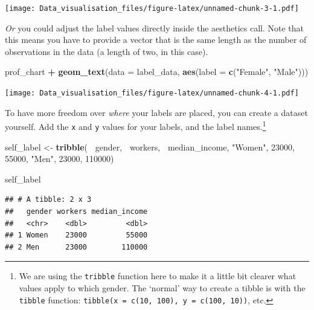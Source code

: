 \documentclass[]{book}
\newenvironment{Shaded}{\begin{snugshade}}{\end{snugshade}}
\newcommand{\DataTypeTok}[1]{\textcolor[rgb]{0.13,0.29,0.53}{#1}}
\newcommand{\DecValTok}[1]{\textcolor[rgb]{0.00,0.00,0.81}{#1}}
\newcommand{\KeywordTok}[1]{\textcolor[rgb]{0.13,0.29,0.53}{\textbf{#1}}}
\newcommand{\NormalTok}[1]{#1}
\newcommand{\OperatorTok}[1]{\textcolor[rgb]{0.81,0.36,0.00}{\textbf{#1}}}
\newcommand{\StringTok}[1]{\textcolor[rgb]{0.31,0.60,0.02}{#1}}
\begin{document}
\texttt{[image: Data\_visualisation\_files/figure-latex/unnamed-chunk-3-1.pdf]}

\emph{Or} you could adjust the label values directly inside the aesthetics call. Note that this means you have to provide a vector that is the same length as the number of observations in the data (a length of two, in this case).

\begin{Shaded}
\begin{Highlighting}[]
\NormalTok{prof_chart }\OperatorTok{+}
\StringTok{  }\KeywordTok{geom_text}\NormalTok{(}\DataTypeTok{data =}\NormalTok{ label_data,}
            \KeywordTok{aes}\NormalTok{(}\DataTypeTok{label =} \KeywordTok{c}\NormalTok{(}\StringTok{"Female"}\NormalTok{, }\StringTok{"Male"}\NormalTok{)))}
\end{Highlighting}
\end{Shaded}

\texttt{[image: Data\_visualisation\_files/figure-latex/unnamed-chunk-4-1.pdf]}

To have more freedom over \emph{where} your labels are placed, you can create a dataset yourself. Add the \texttt{x} and \texttt{y} values for your labels, and the label names.\footnote{We are using the \texttt{tribble} function here to make it a little bit clearer what values apply to which gender. The `normal' way to create a tibble is with the \texttt{tibble} function: \texttt{tibble(x\ =\ c(10,\ 100),\ y\ =\ c(100,\ 10))}, etc.}

\begin{Shaded}
\begin{Highlighting}[]
\NormalTok{self_label <-}\StringTok{ }\KeywordTok{tribble}\NormalTok{(}
  \OperatorTok{~}\NormalTok{gender, }\OperatorTok{~}\NormalTok{workers,   }\OperatorTok{~}\NormalTok{median_income,}
  \StringTok{"Women"}\NormalTok{,    }\DecValTok{23000}\NormalTok{,            }\DecValTok{55000}\NormalTok{,}
  \StringTok{"Men"}\NormalTok{,      }\DecValTok{23000}\NormalTok{,           }\DecValTok{110000}\NormalTok{)}


\NormalTok{self_label}
\end{Highlighting}
\end{Shaded}

\begin{verbatim}
## # A tibble: 2 x 3
##   gender workers median_income
##   <chr>    <dbl>         <dbl>
## 1 Women    23000         55000
## 2 Men      23000        110000
\end{verbatim}
\end{document}
